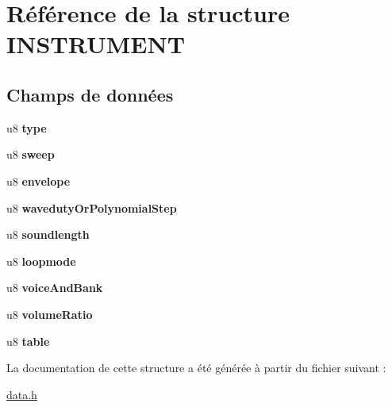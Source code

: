 \hypertarget{struct_i_n_s_t_r_u_m_e_n_t}{
\section{Référence de la structure INSTRUMENT}
\label{struct_i_n_s_t_r_u_m_e_n_t}
}
\subsection*{Champs de données}
\begin{DoxyCompactItemize}
\item 
\hypertarget{struct_i_n_s_t_r_u_m_e_n_t_a34923af2855ec28604554d526eb97c33}{
u8 {\bfseries type}}
\label{struct_i_n_s_t_r_u_m_e_n_t_a34923af2855ec28604554d526eb97c33}

\item 
\hypertarget{struct_i_n_s_t_r_u_m_e_n_t_a8631f5f71803aa58cd851af4919cd4be}{
u8 {\bfseries sweep}}
\label{struct_i_n_s_t_r_u_m_e_n_t_a8631f5f71803aa58cd851af4919cd4be}

\item 
\hypertarget{struct_i_n_s_t_r_u_m_e_n_t_a9e90c973b09de93181dc92b2479499fb}{
u8 {\bfseries envelope}}
\label{struct_i_n_s_t_r_u_m_e_n_t_a9e90c973b09de93181dc92b2479499fb}

\item 
\hypertarget{struct_i_n_s_t_r_u_m_e_n_t_a54aabf48ce8e591830868fe225157dee}{
u8 {\bfseries wavedutyOrPolynomialStep}}
\label{struct_i_n_s_t_r_u_m_e_n_t_a54aabf48ce8e591830868fe225157dee}

\item 
\hypertarget{struct_i_n_s_t_r_u_m_e_n_t_a95a669db24a383bd5d83f637e4bc9f0c}{
u8 {\bfseries soundlength}}
\label{struct_i_n_s_t_r_u_m_e_n_t_a95a669db24a383bd5d83f637e4bc9f0c}

\item 
\hypertarget{struct_i_n_s_t_r_u_m_e_n_t_a8cbe33bff0d7c544428e55850ea1bba9}{
u8 {\bfseries loopmode}}
\label{struct_i_n_s_t_r_u_m_e_n_t_a8cbe33bff0d7c544428e55850ea1bba9}

\item 
\hypertarget{struct_i_n_s_t_r_u_m_e_n_t_a6126b24ce345ae666412f07d5528d164}{
u8 {\bfseries voiceAndBank}}
\label{struct_i_n_s_t_r_u_m_e_n_t_a6126b24ce345ae666412f07d5528d164}

\item 
\hypertarget{struct_i_n_s_t_r_u_m_e_n_t_a1338e4097c1cb451ef7d5a9b7d3c54d7}{
u8 {\bfseries volumeRatio}}
\label{struct_i_n_s_t_r_u_m_e_n_t_a1338e4097c1cb451ef7d5a9b7d3c54d7}

\item 
\hypertarget{struct_i_n_s_t_r_u_m_e_n_t_a5a6e736101953ab6b0f9cfc7e7f40a59}{
u8 {\bfseries table}}
\label{struct_i_n_s_t_r_u_m_e_n_t_a5a6e736101953ab6b0f9cfc7e7f40a59}

\end{DoxyCompactItemize}


La documentation de cette structure a été générée à partir du fichier suivant :\begin{DoxyCompactItemize}
\item 
\hyperlink{data_8h}{data.h}\end{DoxyCompactItemize}
